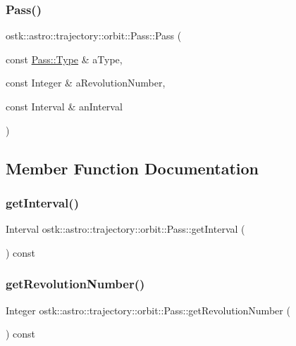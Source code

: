 \subsubsection{\texorpdfstring{Pass()}{Pass()}}
{\footnotesize\ttfamily ostk\+::astro\+::trajectory\+::orbit\+::\+Pass\+::\+Pass (\begin{DoxyParamCaption}\item[{const \hyperlink{classostk_1_1astro_1_1trajectory_1_1orbit_1_1_pass_a74449dbd104c6a24462b373cc55febcc}{Pass\+::\+Type} \&}]{a\+Type,  }\item[{const Integer \&}]{a\+Revolution\+Number,  }\item[{const Interval \&}]{an\+Interval }\end{DoxyParamCaption})}



\subsection{Member Function Documentation}
\mbox{\label{classostk_1_1astro_1_1trajectory_1_1orbit_1_1_pass_a1a3230564b8f40bd878194befeabef1a}} 
\subsubsection{\texorpdfstring{get\+Interval()}{getInterval()}}
{\footnotesize\ttfamily Interval ostk\+::astro\+::trajectory\+::orbit\+::\+Pass\+::get\+Interval (\begin{DoxyParamCaption}{ }\end{DoxyParamCaption}) const}

\mbox{\label{classostk_1_1astro_1_1trajectory_1_1orbit_1_1_pass_abfc538f6a638420298886228f972855d}} 
\subsubsection{\texorpdfstring{get\+Revolution\+Number()}{getRevolutionNumber()}}
{\footnotesize\ttfamily Integer ostk\+::astro\+::trajectory\+::orbit\+::\+Pass\+::get\+Revolution\+Number (\begin{DoxyParamCaption}{ }\end{DoxyParamCaption}) const}

